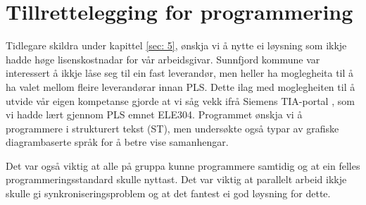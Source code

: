 \chapter{Tillrettelegging for programmering}
\thispagestyle{fancy}
\label{sec:7} 

Tidlegare skildra under kapittel \ref{sec: 5}, ønskja vi å nytte ei løysning som ikkje hadde høge lisenskostnadar for vår arbeidsgivar. 
Sunnfjord kommune var interessert å ikkje låse seg til ein fast leverandør, men heller ha moglegheita til å ha valet mellom fleire 
leverandørar innan \gls{PLS}. Dette ilag med moglegheiten til å utvide vår eigen kompetanse 
gjorde at vi såg vekk ifrå Siemens \gls{TIA}-portal \citep{Siemens}, som vi hadde lært gjennom \gls{PLS} emnet ELE304.
Programmet ønskja vi å programmere i strukturert tekst (\gls{ST}), men undersøkte også 
typar av grafiske diagrambaserte språk for å betre vise samanhengar.

Det var også viktig at alle på gruppa kunne programmere samtidig og at ein felles programmeringsstandard skulle nyttast.
Det var viktig at parallelt arbeid ikkje skulle gi synkroniseringsproblem og at det fantest ei god løysning for dette.

